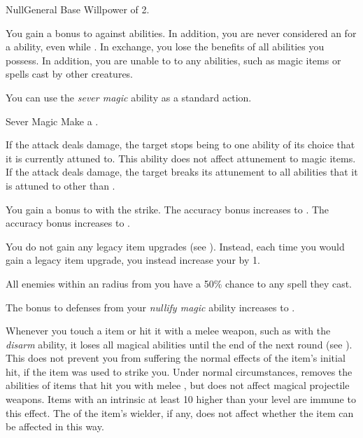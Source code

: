     \begin{feat}{Null}{General}
        \featpre Base Willpower of 2.

         You gain a  bonus to  against  abilities.
        In addition, you are never considered an  for a  ability, even while .
        In exchange, you lose the benefits of all  abilities you possess.
        In addition, you are unable to  to any  abilities, such as magic items or spells cast by other creatures.

         You can use the \textit{sever magic} ability as a standard action.
        \begin{freeability}{Sever Magic}
            Make a .

            \hit If the attack deals damage, the target stops being  to one ability of its choice that it is currently attuned to.
            This ability does not affect attunement to magic items.
            \crit If the attack deals damage, the target breaks its attunement to all abilities that it is attuned to other than .

            \rankline
             You gain a  bonus to  with the strike.
             The accuracy bonus increases to .
             The accuracy bonus increases to .
        \end{freeability}

         You do not gain any legacy item upgrades (see ).
        Instead, each time you would gain a legacy item upgrade, you instead increase your  by 1.

         All enemies within an \areamed radius from you have a 50\% chance to  any spell they cast.

         The bonus to defenses from your \textit{nullify magic} ability increases to .

         Whenever you touch a  item or hit it with a melee weapon, such as with the \textit{disarm} ability, it loses all magical abilities until the end of the next round (see ).
        This does not prevent you from suffering the normal effects of the item's initial hit, if the item was used to strike you.
        Under normal circumstances, removes the abilities of items that hit you with melee , but does not affect magical projectile weapons.
        Items with an intrinsic  at least 10 higher than your level are immune to this effect.
        The  of the item's wielder, if any, does not affect whether the item can be affected in this way.


\end{feat}
